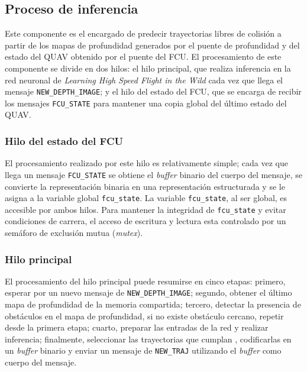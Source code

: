 \subsection{Proceso de inferencia}

Este componente es el encargado de predecir trayectorias libres de colisión a partir de los mapas de profundidad generados por el puente de profundidad y del estado del QUAV obtenido por el puente del FCU. El procesamiento de este componente se divide en dos hilos: el hilo principal, que realiza inferencia en la red neuronal de \textit{Learning High Speed Flight in the Wild} \cite{Loquercio2021} cada vez que llega el mensaje \texttt{NEW\_DEPTH\_IMAGE}; y el hilo del estado del FCU, que se encarga de recibir los mensajes \texttt{FCU\_STATE} para mantener una copia global del último estado del QUAV.

\subsubsection{Hilo del estado del FCU}

El procesamiento realizado por este hilo es relativamente simple; cada vez que llega un mensaje \texttt{FCU\_STATE} se obtiene el \textit{buffer} binario del cuerpo del mensaje, se convierte la representación binaria en una representación estructurada y se le asigna a la variable global \texttt{fcu\_state}. La variable \texttt{fcu\_state}, al ser global, es accesible por ambos hilos. Para mantener la integridad de \texttt{fcu\_state} y evitar condiciones de carrera, el acceso de escritura y lectura esta controlado por un semáforo de exclusión mutua (\textit{mutex}).

\subsubsection{Hilo principal}

El procesamiento del hilo principal puede resumirse en cinco etapas: primero, esperar por un nuevo mensaje de \texttt{NEW\_DEPTH\_IMAGE}; segundo, obtener el último mapa de profundidad de la memoria compartida; tercero, detectar la presencia de obstáculos en el mapa de profundidad, si no existe obstáculo cercano, repetir desde la primera etapa; cuarto, preparar las entradas de la red y realizar inferencia; finalmente, seleccionar las trayectorias que cumplan , codificarlas en un \textit{buffer} binario y enviar un mensaje de \texttt{NEW\_TRAJ} utilizando el \textit{buffer} como cuerpo del mensaje.

